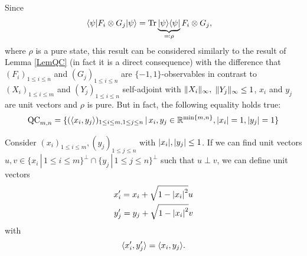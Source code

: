 	Since 
	\begin{align}
		\langle {\psi} \vert F_i\otimes G_j \vert {\psi} \rangle &= \textup{Tr} \, {\underbrace{\vert {\psi} \rangle\langle {\psi} \vert}_{\eqqcolon\rho}F_i\otimes G_j} ,
	\end{align}
	where $\rho$ is a pure state, this result can be considered similarly to the result of Lemma \ref{LemQC} (in fact it is a direct consequence) with the difference that $(F_i)_{1\leq i \leq n}$ and $(G_j)_{1\leq i \leq n}$ are $\{-1,1\}$-observables in contrast to $(X_i)_{1\leq i \leq m}$ and $(Y_j)_{1\leq i \leq n}$ self-adjoint with $ \Vert {X_i} \Vert_\infty,$ $ \Vert {Y_j} \Vert_\infty\leq 1$, $x_i$ and $y_j$ are unit vectors and $\rho$ is pure. But in fact, the following equality holds true:
	\begin{equation}
		\textup{QC}_{m,n} = \{(\langle{x_i},{y_j}\rangle)_{1\leq i\leq m, 1\leq j \leq n} \,| \, x_i,y_j \in \mathbb{R}^{\min\{m,n\}}, {\left|{x_i}\right|}=1, {\left|{y_j}\right|}=1\}
	\end{equation}
	
	Consider $(x_i)_{1\leq i \leq m},(y_j)_{1\leq j \leq n}$ with ${\left|{x_i}\right|},{\left|{y_j}\right|} \leq 1$. If we can find unit vectors $u,v\in\{x_i\,| \, 1\leq i \leq m\}^\perp \cap \{y_j\,| \, 1\leq j \leq n\}^\perp$ such that $u\perp v$, we can define unit vectors
	\begin{align*}
		x_i^\prime = x_i + \sqrt{1-{\left|{x_i}\right|}^2}u\\
		y_j^\prime = y_j + \sqrt{1-{\left|{x_i}\right|}^2}v\\  
	\end{align*}
	with
	\[
		\langle{x_i^\prime},{y_j^\prime}\rangle = \langle{x_i},{y_j}\rangle.
	\] 
	
	
